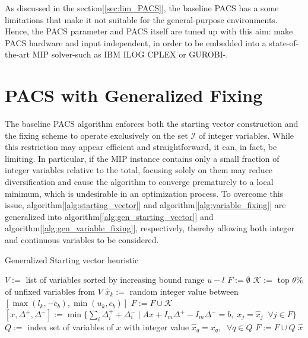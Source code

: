 As discussed in the section[\ref{sec:lim_PACS}], the baseline PACS has a some limitations that make it not suitable for the general-purpose environments. Hence, the PACS parameter and PACS itself are tuned up with this aim: make PACS hardware and input independent, in order to be embedded into a state-of-the-art MIP solver-such as IBM ILOG CPLEX or GUROBI-.

\section{PACS with Generalized Fixing}
The baseline PACS algorithm enforces both the starting vector construction and the fixing scheme to operate exclusively on the set $\mathcal{I}$ of integer variables. While this restriction may appear efficient and straightforward, it can, in fact, be limiting. In particular, if the MIP instance contains only a small fraction of integer variables relative to the total, focusing solely on them may reduce diversification and cause the algorithm to converge prematurely to a local minimum, which is undesirable in an optimization process.
To overcome this issue, algorithm[\ref{alg:starting_vector}] and algorithm[\ref{alg:variable_fixing}] are generalized into algorithm[\ref{alg:gen_starting_vector}] and algorithm[\ref{alg:gen_variable_fixing}], respectively, thereby allowing both integer and continuous variables to be considered.
\begin{algorithm}[H]
\caption{Generalized Starting vector heuristic}\label{alg:gen_starting_vector}
\begin{algorithmic}[1]
\State $V :=$ list of  variables sorted by increasing bound range $u-l$
\State $F := \emptyset$
    \State $\mathcal{K} :=$ top $\theta \%$ of unfixed variables from $V$
        \State $\hat{x}_k :=$ random integer value between $[\max(l_k, -c_b), \min(u_k, c_b)]$
    \EndFor
    \State $F := F \cup \mathcal{K}$
    \State $[x, \Delta^+, \Delta^-] := \min\{\sum_i \Delta_i^+ + \Delta_i^- \mid A x + I_m \Delta^+ - I_m \Delta^- = b, \; x_j = \hat{x}_j \;\; \forall j \in F\}$
    \State $Q :=$ index set of  variables of $x$ with integer value
    \State $\hat{x}_q = x_q, \;\; \forall q \in Q$
    \State $F := F \cup Q$
\EndWhile
\State \Return $\hat{x}$
\end{algorithmic}
\end{algorithm}
